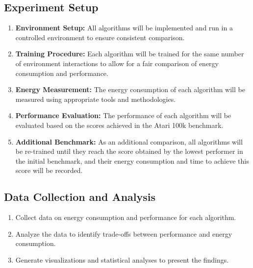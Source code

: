 \subsection{Experiment Setup}

\begin{enumerate}
	\item \textbf{Environment Setup:} All algorithms will be implemented and run in a controlled environment to ensure consistent comparison.
	\item \textbf{Training Procedure:} Each algorithm will be trained for the same number of environment interactions to allow for a fair comparison of energy consumption and performance.
	\item \textbf{Energy Measurement:} The energy consumption of each algorithm will be measured using appropriate tools and methodologies.
	\item \textbf{Performance Evaluation:} The performance of each algorithm will be evaluated based on the scores achieved in the Atari 100k benchmark.
	\item \textbf{Additional Benchmark:} As an additional comparison, all algorithms will be re-trained until they reach the score obtained by the lowest performer in the initial benchmark, and their energy consumption and time to achieve this score will be recorded.
\end{enumerate}

\subsection{Data Collection and Analysis}

\begin{enumerate}
	\item Collect data on energy consumption and performance for each algorithm.
	\item Analyze the data to identify trade-offs between performance and energy consumption.
	\item Generate visualizations and statistical analyses to present the findings.
\end{enumerate}
